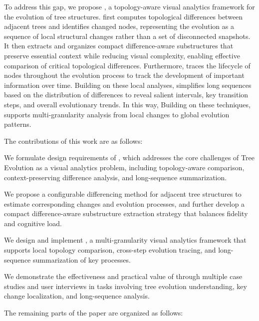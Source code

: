To address this gap, we propose \sysname{}, a topology-aware visual analytics framework for the evolution of tree structures. \sysname{} first computes topological differences between adjacent trees and identifies changed nodes, representing the evolution as a sequence of local structural changes rather than a set of disconnected snapshots. It then extracts and organizes compact difference-aware substructures that preserve essential context while reducing visual complexity, enabling effective comparison of critical topological differences. Furthermore, \sysname{} traces the lifecycle of nodes throughout the evolution process to track the development of important information over time. Building on these local analyses, \sysname{} simplifies long sequences based on the distribution of differences to reveal salient intervals, key transition steps, and overall evolutionary trends. In this way, Building on these techniques, \sysname{} supports multi-granularity analysis from local changes to global evolution patterns.

The contributions of this work are as follows:

\squishlist
\item We formulate design requirements of \sysname, which addresses the core challenges of Tree Evolution as a visual analytics problem, including topology-aware comparison, context-preserving difference analysis, and long-sequence summarization.


\item We propose a configurable differencing method for adjacent tree structures to estimate corresponding changes and evolution processes, and further develop a compact difference-aware substructure extraction strategy that balances fidelity and cognitive load.

\item We design and implement \sysname{}, a multi-granularity visual analytics framework that supports local topology comparison, cross-step evolution tracing, and long-sequence summarization of key processes.

\item We demonstrate the effectiveness and practical value of \sysname{} through multiple case studies and user interviews in tasks involving tree evolution understanding, key change localization, and long-sequence analysis.

\squishend

The remaining parts of the paper are organized as follows:
